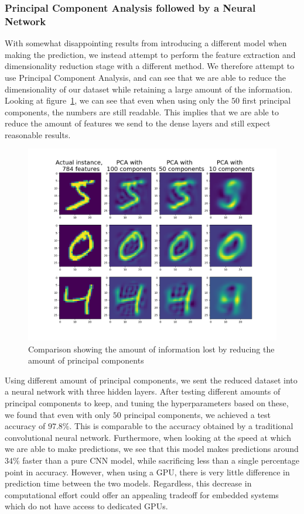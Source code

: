 \documentclass[onecolumn,10pt,cleanfoot]{asme2ej}
\begin{document}
\subsubsection{Principal Component Analysis followed by a Neural Network}

With somewhat disappointing results from introducing a different model when making the prediction, we instead attempt to perform the feature extraction and dimensionality reduction stage with a different method. We therefore attempt to use Principal Component Analysis, and can see that we are able to reduce the dimensionality of our dataset while retaining a large amount of the information. Looking at figure~\ref{pcacomp}, we can see that even when using only the $50$ first principal components, the numbers are still readable. This implies that we are able to reduce the amount of features we send to the dense layers and still expect reasonable results.

\begin{figure}[H]
\centerline{\includegraphics[width=5in]{figure/pcacomp.png}}
\caption{Comparison showing the amount of information lost by reducing the amount of principal components}
\label{pcacomp}
\end{figure}

Using different amount of principal components, we sent the reduced dataset into a neural network with three hidden layers. After testing different amounts of principal components to keep, and tuning the hyperparameters based on these, we found that even with only $50$ principal components, we achieved a test accuracy of $97.8\%$. This is comparable to the accuracy obtained by a traditional convolutional neural network. Furthermore, when looking at the speed at which we are able to make predictions, we see that this model makes predictions around $34\%$ faster than a pure CNN model, while sacrificing less than a single percentage point in accuracy. However, when using a GPU, there is very little difference in prediction time between the two models. Regardless, this decrease in computational effort could offer an appealing tradeoff for embedded systems which do not have access to dedicated GPUs.
\end{document}
